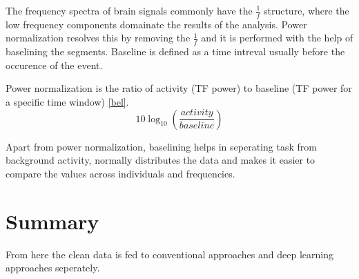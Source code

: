 The frequency spectra of brain signals commonly have the $\frac{1}{f}$ structure, where the low frequency components domainate the results of the analysis. Power normalization resolves this by removing the $\frac{1}{f}$ and it is performed with the help of baselining the segments. Baseline is defined as a time intreval usually before the occurence of the event.

Power normalization is the ratio of activity (TF power) to baseline (TF power for a specific time window) \ref*{bel}.
\begin{equation} \label{eq:bell}
    10\log_{10}(\frac{activity}{baseline})
\end{equation}

Apart from power normalization, baselining helps in seperating task from background activity, normally distributes the data and makes it easier to compare the values across individuals and frequencies.

\section*{Summary}
From here the clean data is fed to conventional approaches and deep learning approaches seperately.
